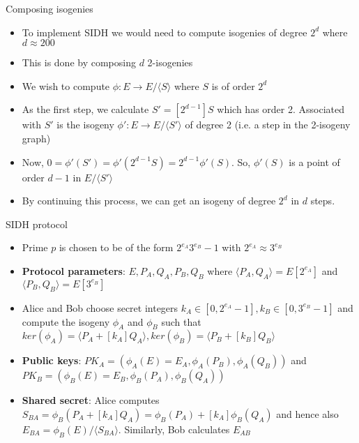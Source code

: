 \documentclass{beamer}
\begin{document}
\begin{frame}{Composing isogenies}
\begin{itemize}
    \item To implement SIDH we would need to compute isogenies of degree $2^{d}$ where $d \approx 200$
    \item This is done by composing $d$ 2-isogenies
    \item We wish to compute $\phi: E \rightarrow E/\langle S \rangle$ where $S$ is of order $2^d$
    \item As the first step, we calculate $S' = [2^{d-1}]S$ which has order 2. Associated with $S'$ is the isogeny $\phi': E \rightarrow E/\langle S' \rangle$ of degree 2 (i.e. a step in the 2-isogeny graph)
    \item Now, $0 = \phi'(S') = \phi'(2^{d-1}S) = 2^{d-1}\phi'(S)$. So, $\phi'(S)$ is a point of order $d-1$ in $E/\langle S' \rangle$
    \item By continuing this process, we can get an isogeny of degree $2^d$ in $d$ steps.
\end{itemize}
\end{frame}

\begin{frame}{SIDH protocol}
\begin{itemize}
    \item Prime $p$ is chosen to be of the form $2^{e_A}3^{e_B}-1$ with $2^{e_A} \approx 3^{e_B}$
    \item \textbf{Protocol parameters}: $E, P_A, Q_A, P_B, Q_B$ where $\langle P_A, Q_A \rangle = E[2^{e_A}]$ and $\langle P_B, Q_B \rangle = E[3^{e_B}]$
    \item Alice and Bob choose secret integers $k_A \in [0, 2^{e_A}-1], k_B \in [0, 3^{e_B}-1]$ and compute the isogeny $\phi_A$ and $\phi_B$ such that $ker(\phi_A) = \langle P_A + [k_A]Q_A \rangle, ker(\phi_B) = \langle P_B + [k_B]Q_B \rangle$ 
    \item \textbf{Public keys}: $PK_A = (\phi_A(E)=E_A, \phi_A(P_B), \phi_A(Q_B))$ and $PK_B = (\phi_B(E)=E_B, \phi_B(P_A), \phi_B(Q_A))$
    \item \textbf{Shared secret}: Alice computes $S_{BA} = \phi_B(P_A + [k_A]Q_A) = \phi_B(P_A) + [k_A]\phi_B(Q_A)$ and hence also $E_{BA} = \phi_B(E) / \langle S_{BA} \rangle$. Similarly, Bob calculates $E_{AB}$
\end{itemize}
\end{frame}

\end{document}
